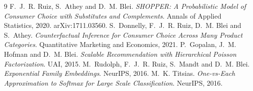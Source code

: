 \documentclass[11pt]{article}
\begin{document}
\begin{thebibliography}{9}
F.~J.~R. Ruiz, S.~Athey and D.~M. Blei.
\emph{SHOPPER: A Probabilistic Model of Consumer Choice with Substitutes and Complements}.
Annals of Applied Statistics, 2020. arXiv:1711.03560.
S.~Donnelly, F.~J.~R. Ruiz, D.~M. Blei and S.~Athey.
\emph{Counterfactual Inference for Consumer Choice Across Many Product Categories}.
Quantitative Marketing and Economics, 2021.
P.~Gopalan, J.~M. Hofman and D.~M. Blei. \emph{Scalable Recommendation with Hierarchical
Poisson Factorization}. UAI, 2015.
M.~Rudolph, F.~J.~R. Ruiz, S.~Mandt and D.~M. Blei. \emph{Exponential Family Embeddings}.
NeurIPS, 2016.
M.~K. Titsias. \emph{One-vs-Each Approximation to Softmax for Large Scale Classification}.
NeurIPS, 2016.
\end{thebibliography}
\end{document}

